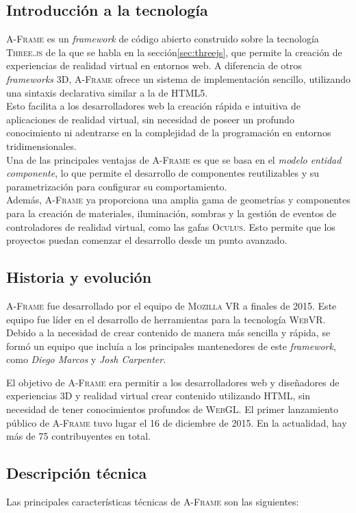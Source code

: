 \documentclass[a4paper, 11pt]{book}
\begin{document}
\subsection{Introducción a la tecnología}
\textsc{A-Frame}\cite{aframedocs} es un \emph{framework} de código abierto construido sobre la tecnología \textsc{Three.js} de la que se habla en la sección\ref{sec:threejs}, que permite la creación de experiencias de realidad virtual en entornos web. A diferencia de otros \emph{frameworks} \textsc{3D}, \textsc{A-Frame} ofrece un sistema de implementación sencillo, utilizando una sintaxis declarativa similar a la de \textsc{HTML5}. \\
Esto facilita a los desarrolladores web la creación rápida e intuitiva de aplicaciones de realidad virtual, sin necesidad de poseer un profundo conocimiento ni adentrarse en la complejidad de la programación en entornos tridimensionales.\\
Una de las principales ventajas de \textsc{A-Frame} es que se basa en el \emph{modelo entidad componente}, lo que permite el desarrollo de componentes reutilizables y su parametrización para configurar su comportamiento.\\
Además, \textsc{A-Frame} ya proporciona una amplia gama de geometrías y componentes para la creación de materiales, iluminación, sombras y la gestión de eventos de controladores de realidad virtual, como las gafas \textsc{Oculus}. Esto permite que los proyectos puedan comenzar el desarrollo desde un punto avanzado.

\subsection{Historia y evolución}
\textsc{A-Frame} fue desarrollado por el equipo de \textsc{Mozilla VR} a finales de 2015. Este equipo fue líder en el desarrollo de herramientas para la tecnología \textsc{WebVR}. Debido a la necesidad de crear contenido de manera más sencilla y rápida, se formó un equipo que incluía a los principales mantenedores de este \emph{framework}, como \emph{Diego Marcos} y \emph{Josh Carpenter}. 

El objetivo de \textsc{A-Frame} era permitir a los desarrolladores web y diseñadores de experiencias \textsc{3D} y realidad virtual crear contenido utilizando \textsc{HTML}, sin necesidad de tener conocimientos profundos de \textsc{WebGL}. El primer lanzamiento público de \textsc{A-Frame} tuvo lugar el 16 de diciembre de 2015. En la actualidad, hay más de 75 contribuyentes en total.
\subsection{Descripción técnica}
Las principales características técnicas de \textsc{A-Frame} son las siguientes:
\end{document}
